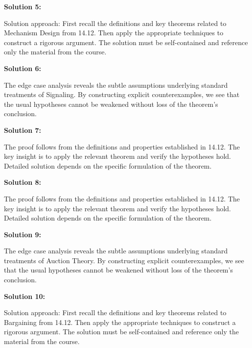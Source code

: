 \documentclass[12pt,a4paper]{exam}
\begin{document}
\vspace{0.5cm}

\textbf{Solution 5:}

Solution approach: First recall the definitions and key theorems related to Mechanism Design from 14.12. Then apply the appropriate techniques to construct a rigorous argument. The solution must be self-contained and reference only the material from the course.

\vspace{0.5cm}

\textbf{Solution 6:}

The edge case analysis reveals the subtle assumptions underlying standard treatments of Signaling. By constructing explicit counterexamples, we see that the usual hypotheses cannot be weakened without loss of the theorem's conclusion.

\vspace{0.5cm}

\textbf{Solution 7:}

The proof follows from the definitions and properties established in 14.12. The key insight is to apply the relevant theorem and verify the hypotheses hold. Detailed solution depends on the specific formulation of the theorem.

\vspace{0.5cm}

\textbf{Solution 8:}

The proof follows from the definitions and properties established in 14.12. The key insight is to apply the relevant theorem and verify the hypotheses hold. Detailed solution depends on the specific formulation of the theorem.

\vspace{0.5cm}

\textbf{Solution 9:}

The edge case analysis reveals the subtle assumptions underlying standard treatments of Auction Theory. By constructing explicit counterexamples, we see that the usual hypotheses cannot be weakened without loss of the theorem's conclusion.

\vspace{0.5cm}

\textbf{Solution 10:}

Solution approach: First recall the definitions and key theorems related to Bargaining from 14.12. Then apply the appropriate techniques to construct a rigorous argument. The solution must be self-contained and reference only the material from the course.
\end{document}
